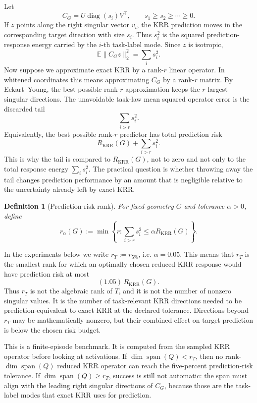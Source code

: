 \documentclass[11pt]{article}
\newtheorem{definition}{Definition}
\newcommand{\spanop}{\operatorname{span}}
\begin{document}
Let
\[
C_G=U\operatorname{diag}(s_i)V^\top,
\qquad
s_1\ge s_2\ge\cdots\ge0.
\]
If \(z\) points along the right singular vector \(v_i\), the KRR prediction moves in the
corresponding target direction with size \(s_i\). Thus \(s_i^2\) is the squared prediction-response
energy carried by the \(i\)-th task-label mode. Since \(z\) is isotropic,
\[
\mathbb{E}\|C_Gz\|_2^2=\sum_i s_i^2.
\]
Now suppose we approximate exact KRR by a rank-\(r\) linear operator. In whitened coordinates this
means approximating \(C_G\) by a rank-\(r\) matrix. By Eckart--Young, the best possible rank-\(r\)
approximation keeps the \(r\) largest singular directions. The unavoidable task-law mean squared
operator error is the discarded tail
\[
\sum_{i>r}s_i^2.
\]
Equivalently, the best possible rank-\(r\) predictor has total prediction risk
\[
R_{\mathrm{KRR}}(G)+\sum_{i>r}s_i^2.
\]
This is why the tail is compared to \(R_{\mathrm{KRR}}(G)\), not to zero and not only to the total
response energy \(\sum_i s_i^2\). The practical question is whether throwing away the tail changes
prediction performance by an amount that is negligible relative to the uncertainty already left by
exact KRR.

\begin{definition}[Prediction-risk rank]
For fixed geometry \(G\) and tolerance \(\alpha>0\), define
\[
r_\alpha(G)
:=
\min\left\{
r:
\sum_{i>r}s_i^2
\le
\alpha R_{\mathrm{KRR}}(G)
\right\}.
\]
\end{definition}

In the experiments below we write \(r_T:=r_{5\%}\), i.e. \(\alpha=0.05\). This means that \(r_T\) is
the smallest rank for which an optimally chosen reduced KRR response would have prediction risk at
most
\[
(1.05)\,R_{\mathrm{KRR}}(G).
\]
Thus \(r_T\) is not the algebraic rank of \(T\), and it is not the number of nonzero singular values.
It is the number of task-relevant KRR directions needed to be prediction-equivalent to exact KRR at
the declared tolerance. Directions beyond \(r_T\) may be mathematically nonzero, but their combined
effect on target prediction is below the chosen risk budget.

This is a finite-episode benchmark. It is computed from the sampled KRR operator before looking at
activations. If \(\dim\spanop(Q)<r_T\), then no rank-\(\dim\spanop(Q)\) reduced KRR operator can
reach the five-percent prediction-risk tolerance. If \(\dim\spanop(Q)\ge r_T\), success is still not
automatic: the span must align with the leading right singular directions of \(C_G\), because those
are the task-label modes that exact KRR uses for prediction.
\end{document}

